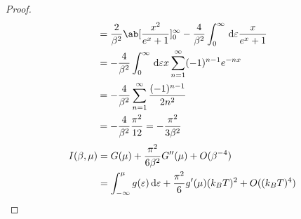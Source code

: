 \documentclass[a4paper,11pt]{jlreq}
\begin{document}
\begin{proof}
\begin{align}
                                                                                  & = \frac{2}{\beta^2}\ab[\frac{x^2}{e^x + 1}]_{0}^{\infty} - \frac{4}{\beta^2}\int_{0}^{\infty}\dl{\varepsilon}\frac{x}{e^x + 1}                                      \\
                                                                                  & = - \frac{4}{\beta^2}\int_{0}^{\infty}\dl{\varepsilon}x\sum_{n=1}^{\infty}(-1)^{n-1}e^{-nx}                                                                         \\
                                                                                  & = - \frac{4}{\beta^2}\sum_{n=1}^{\infty}\frac{(-1)^{n-1}}{2n^2}                                                                                                     \\
                                                                                  & = - \frac{4}{\beta^2}\frac{\pi^2}{12} = -\frac{\pi^2}{3\beta^2}
  \end{align}
  \begin{align}
    I(\beta, \mu) & = G(\mu) + \frac{\pi^2}{6\beta^2}G''(\mu) + O(\beta^{-4})                                            \\
                  & = \int_{-\infty}^\mu g(\varepsilon)\dl{\varepsilon} + \frac{\pi^2}{6}g'(\mu)(k_BT)^2 + O((k_BT)^{4})
  \end{align}
\end{proof}
\end{document}
